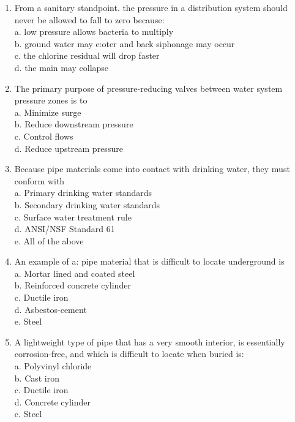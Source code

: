 \documentclass{article}
\begin{document}
\begin{enumerate}[1.]
\item From a sanitary standpoint. the pressure in a distribution system should never be allowed to fall to zero because:\\
a.	low pressure allows bacteria to multiply\\
b.	ground water may e:oter and back siphonage may occur\\
c.	the chlorine residual will drop faster\\
d.	the main may collapse\\

\item The primary purpose of pressure-reducing valves between water system pressure zones is to\\
a. Minimize surge\\
b. Reduce downstream pressure\\
c. Control flows\\
d. Reduce upstream pressure

\item Because pipe materials come into contact with drinking water, they must conform with\\
a. Primary drinking water standards\\
b. Secondary drinking water standards\\
c. Surface water treatment rule\\
d. ANSI/NSF Standard 61\\
e. All of the above\\

\item An example of a: pipe material that is difficult to locate underground is\\
a. Mortar lined and coated steel\\
b. Reinforced concrete cylinder\\
c. Ductile iron\\
d. Asbestos-cement\\
e. Steel\\

\item A lightweight type of pipe that has a very smooth interior, is essentially corrosion-free, and which is difficult to locate when buried is:\\
a. Polyvinyl chloride\\
b. Cast iron\\
c. Ductile iron\\
d. Concrete cylinder\\
e. Steel


\end{enumerate}
\end{document}
